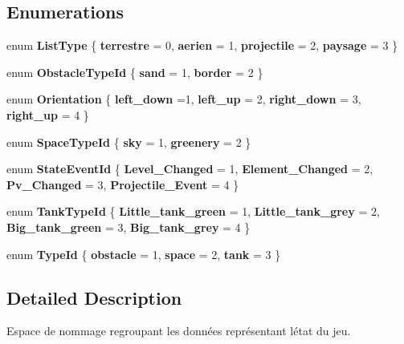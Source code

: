 \subsection*{Enumerations}
\begin{DoxyCompactItemize}
\item 
\mbox{\label{namespacestate_acdd67f28d032af61c857718a6945df94}} 
enum {\bfseries List\+Type} \{ {\bfseries terrestre} = 0, 
{\bfseries aerien} = 1, 
{\bfseries projectile} = 2, 
{\bfseries paysage} = 3
 \}
\item 
\mbox{\label{namespacestate_a83db3ada133da88934c6ab78f39488af}} 
enum {\bfseries Obstacle\+Type\+Id} \{ {\bfseries sand} = 1, 
{\bfseries border} = 2
 \}
\item 
\mbox{\label{namespacestate_a356fdb25c53a0d3f532a2f9770fdd63d}} 
enum {\bfseries Orientation} \{ {\bfseries left\+\_\+down} =1, 
{\bfseries left\+\_\+up} = 2, 
{\bfseries right\+\_\+down} = 3, 
{\bfseries right\+\_\+up} = 4
 \}
\item 
\mbox{\label{namespacestate_a1648cef1bd53299cc6dfd90eeee3c0f1}} 
enum {\bfseries Space\+Type\+Id} \{ {\bfseries sky} = 1, 
{\bfseries greenery} = 2
 \}
\item 
\mbox{\label{namespacestate_a5a660a8300e8f8d4be0e2ec73800de09}} 
enum {\bfseries State\+Event\+Id} \{ {\bfseries Level\+\_\+\+Changed} = 1, 
{\bfseries Element\+\_\+\+Changed} = 2, 
{\bfseries Pv\+\_\+\+Changed} = 3, 
{\bfseries Projectile\+\_\+\+Event} = 4
 \}
\item 
\mbox{\label{namespacestate_aff734372f7f087a0e1f635cb9716dd1a}} 
enum {\bfseries Tank\+Type\+Id} \{ {\bfseries Little\+\_\+tank\+\_\+green} = 1, 
{\bfseries Little\+\_\+tank\+\_\+grey} = 2, 
{\bfseries Big\+\_\+tank\+\_\+green} = 3, 
{\bfseries Big\+\_\+tank\+\_\+grey} = 4
 \}
\item 
\mbox{\label{namespacestate_a52ac81a498c9b1ebe1b905a40439c7d3}} 
enum {\bfseries Type\+Id} \{ {\bfseries obstacle} = 1, 
{\bfseries space} = 2, 
{\bfseries tank} = 3
 \}
\end{DoxyCompactItemize}


\subsection{Detailed Description}
Espace de nommage regroupant les données représentant l\textquotesingle{}état du jeu. 